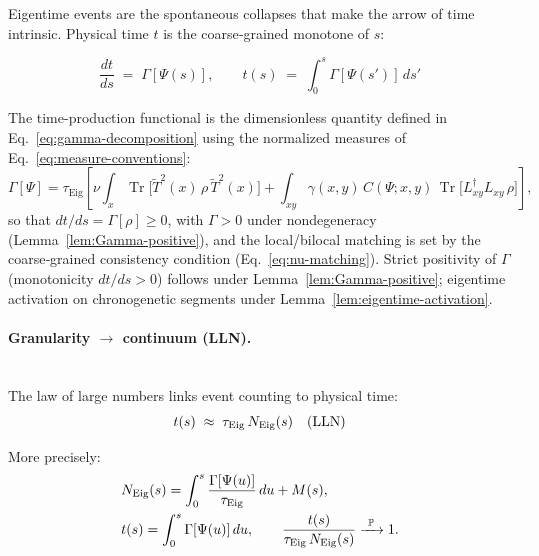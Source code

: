 \documentclass[12pt,a4paper]{article}
\renewcommand{\Tr}{\operatorname{Tr}}
\numberwithin{equation}{section}
\begin{document}
\vspace{0.5cm}

Eigentime events are the spontaneous collapses that make the arrow of time intrinsic. Physical time $t$ is the coarse‑grained monotone of $s$:

\vspace{0.5cm}

\[
\frac{dt}{ds} \;=\; \Gamma[\Psi(s)],
\qquad
t(s) \;=\; \int_0^{s} \Gamma[\Psi(s')]\,ds'
\]

\vspace{0.5cm}

\noindent The time-production functional is the dimensionless quantity defined in
Eq.~\eqref{eq:gamma-decomposition} using the normalized measures of Eq.~\eqref{eq:measure-conventions}:
\[
\Gamma[\Psi] = \tau_{\mathrm{Eig}} \left[
\nu \int_x \Tr\bigl[\tilde{T}^2(x)\,\rho\,\tilde{T}^2(x)\bigr]
+ \int_{xy} \gamma(x,y)\,C(\Psi;x,y)\,\Tr\bigl[L_{xy}^\dagger L_{xy}\,\rho\bigr]
\right],
\]
so that $dt/ds=\Gamma[\rho]\ge 0$, with $\Gamma>0$ under nondegeneracy (Lemma~\ref{lem:Gamma-positive}), and the local/bilocal matching is set by the coarse‑grained consistency condition (Eq.~\eqref{eq:nu-matching}). Strict positivity of $\Gamma$ (monotonicity $dt/ds>0$) follows under Lemma~\ref{lem:Gamma-positive}; eigentime activation on chronogenetic segments under Lemma~\ref{lem:eigentime-activation}.

\vspace{0.5cm}

\paragraph{Granularity $\to$ continuum (LLN).}

\vspace{0.5cm}
~\\ 

\noindent The law of large numbers links event counting to physical time:
\begin{equation}
t(s) \;\approx\; \tau_{\rm Eig}\,N_{\rm Eig}(s) \quad\text{(LLN)}
\label{eq:countingtotime-relation}
\end{equation}

\noindent More precisely:
\begin{align}
&N_{\mathrm{Eig}}(s)=\int_0^s \frac{\Gamma[\Psi(u)]}{\tau_{\rm Eig}}\,du + M(s), \notag\\
&t(s)=\int_0^s \Gamma[\Psi(u)]\,du, \qquad
\frac{t(s)}{\tau_{\rm Eig}\,N_{\mathrm{Eig}}(s)} \xrightarrow{\ \mathbb{P}\ } 1. \notag
\end{align}
\end{document}
